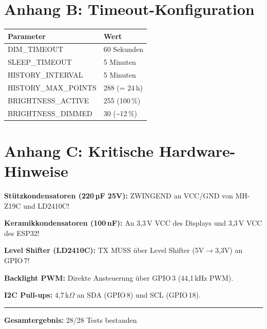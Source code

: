 \documentclass[a4paper,11pt]{article}
\begin{document}
\section{Anhang B: Timeout-Konfiguration}

\begin{longtable}{l l}
\toprule
\rowcolor{tableheader}
\textbf{Parameter} & \textbf{Wert} \\
\midrule
DIM\_TIMEOUT & 60 Sekunden \\
SLEEP\_TIMEOUT & 5 Minuten \\
HISTORY\_INTERVAL & 5 Minuten \\
HISTORY\_MAX\_POINTS & 288 (= 24\,h) \\
BRIGHTNESS\_ACTIVE & 255 (100\,\%) \\
BRIGHTNESS\_DIMMED & 30 (\textasciitilde12\,\%) \\
\bottomrule
\end{longtable}

\section{Anhang C: Kritische Hardware-Hinweise}

\textbf{Stützkondensatoren (220\,µF 25V):} ZWINGEND an VCC/GND von MH-Z19C und LD2410C!

\textbf{Keramikkondensatoren (100\,nF):} An 3,3\,V VCC des Displays und 3,3\,V VCC des ESP32!

\textbf{Level Shifter (LD2410C):} TX MUSS über Level Shifter (5V$\rightarrow$3,3V) an GPIO\,7!

\textbf{Backlight PWM:} Direkte Ansteuerung über GPIO\,3 (44,1\,kHz PWM).

\textbf{I2C Pull-ups:} 4,7\,k$\Omega$ an SDA (GPIO\,8) und SCL (GPIO\,18).

\vspace{1cm}
\noindent\rule{\textwidth}{0.4pt}
\vspace{0.5cm}

\textbf{Gesamtergebnis:} 28/28 Tests bestanden \textcolor{pass}{\checkmark}
\end{document}
